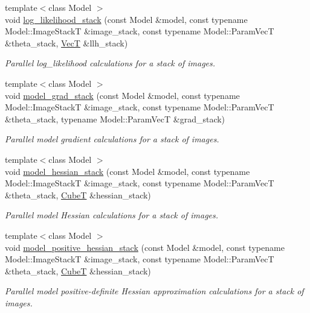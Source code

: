 \begin{DoxyCompactItemize}
{\footnotesize template$<$class Model $>$ }\\void \hyperlink{namespacemappel_aa57494d2d4d7461509dfc3f657cea340}{log\+\_\+likelihood\+\_\+stack} (const Model \&model, const typename Model\+::\+Image\+StackT \&image\+\_\+stack, const typename Model\+::\+Param\+VecT \&theta\+\_\+stack, \hyperlink{namespacemappel_a2225ad69f358daa3f4f99282a35b9a3a}{VecT} \&llh\+\_\+stack)
\begin{DoxyCompactList}\small\item\em Parallel log\+\_\+likelihood calculations for a stack of images. \end{DoxyCompactList}\item 
{\footnotesize template$<$class Model $>$ }\\void \hyperlink{namespacemappel_a053f2ea8e88ce464bb0c41657fac50ef}{model\+\_\+grad\+\_\+stack} (const Model \&model, const typename Model\+::\+Image\+StackT \&image\+\_\+stack, const typename Model\+::\+Param\+VecT \&theta\+\_\+stack, typename Model\+::\+Param\+VecT \&grad\+\_\+stack)
\begin{DoxyCompactList}\small\item\em Parallel model gradient calculations for a stack of images. \end{DoxyCompactList}\item 
{\footnotesize template$<$class Model $>$ }\\void \hyperlink{namespacemappel_a74564859e87b485dda106ce035b9157b}{model\+\_\+hessian\+\_\+stack} (const Model \&model, const typename Model\+::\+Image\+StackT \&image\+\_\+stack, const typename Model\+::\+Param\+VecT \&theta\+\_\+stack, \hyperlink{namespacemappel_ab2afab4e6c8805e83946670d882768c2}{CubeT} \&hessian\+\_\+stack)
\begin{DoxyCompactList}\small\item\em Parallel model Hessian calculations for a stack of images. \end{DoxyCompactList}\item 
{\footnotesize template$<$class Model $>$ }\\void \hyperlink{namespacemappel_a2e223ad253e6d02bcc65056de3af6c24}{model\+\_\+positive\+\_\+hessian\+\_\+stack} (const Model \&model, const typename Model\+::\+Image\+StackT \&image\+\_\+stack, const typename Model\+::\+Param\+VecT \&theta\+\_\+stack, \hyperlink{namespacemappel_ab2afab4e6c8805e83946670d882768c2}{CubeT} \&hessian\+\_\+stack)
\begin{DoxyCompactList}\small\item\em Parallel model positive-\/definite Hessian approximation calculations for a stack of images. \end{DoxyCompactList}\item 

\end{DoxyCompactItemize}
